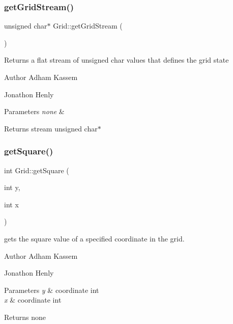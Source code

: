 \subsubsection{\texorpdfstring{get\+Grid\+Stream()}{getGridStream()}}
{\footnotesize\ttfamily unsigned char$\ast$ Grid\+::get\+Grid\+Stream (\begin{DoxyParamCaption}{ }\end{DoxyParamCaption})\hspace{0.3cm}{\ttfamily [inline]}}

Returns a flat stream of unsigned char values that defines the grid state \begin{DoxyAuthor}{Author}
Adham Kassem 

Jonathon Henly 
\end{DoxyAuthor}

\begin{DoxyParams}{Parameters}
{\em none} & \\
\hline
\end{DoxyParams}
\begin{DoxyReturn}{Returns}
stream unsigned char$\ast$ 
\end{DoxyReturn}
\mbox{\label{classGrid_aecf93fb530503819997f56c8e9dc282c}} 
\subsubsection{\texorpdfstring{get\+Square()}{getSquare()}}
{\footnotesize\ttfamily int Grid\+::get\+Square (\begin{DoxyParamCaption}\item[{int}]{y,  }\item[{int}]{x }\end{DoxyParamCaption})\hspace{0.3cm}{\ttfamily [inline]}}

gets the square value of a specified coordinate in the grid. \begin{DoxyAuthor}{Author}
Adham Kassem 

Jonathon Henly 
\end{DoxyAuthor}

\begin{DoxyParams}{Parameters}
{\em y} & coordinate int \\
\hline
{\em x} & coordinate int \\
\hline
\end{DoxyParams}
\begin{DoxyReturn}{Returns}
none 
\end{DoxyReturn}
\mbox{\label{classGrid_a8d0393b3b893d201b4afd9062487a59f}} 
